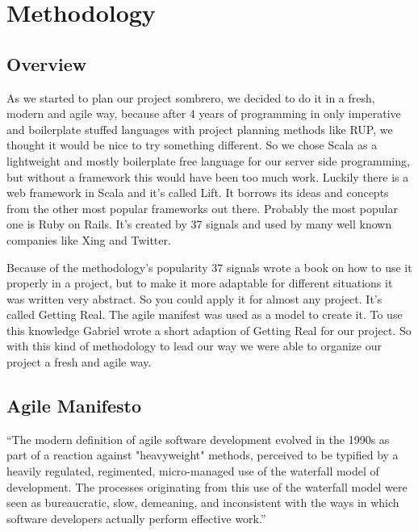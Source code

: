 \section{Methodology}
\subsection{Overview}

As we started to plan our project sombrero, we decided to do it in a fresh, modern and agile way, because after 4 years of programming in only imperative and boilerplate stuffed languages with project planning methods like RUP, we thought it would be nice to try something different. So we chose Scala as a lightweight and mostly boilerplate free language for our server side programming, but without a framework this would have been too much work. Luckily there is a web framework in Scala and it's called Lift. It borrows its ideas and concepts from the other most popular frameworks out there. Probably the most popular one is Ruby on Rails. It's created by 37 signals and used by many well known companies like Xing and Twitter.

Because of the methodology's popularity 37 signals wrote a book on how to use it properly in a project, but to make it more adaptable for different situations it was written very abstract. So you could apply it for almost any project. It's called Getting Real. The agile manifest was used as a model to create it. To use this knowledge Gabriel wrote a short adaption of Getting Real for our project. So with this kind of methodology to lead our way we were able to organize our project a fresh and agile way.

  \clearpage
\subsection{Agile Manifesto}
 ``The modern definition of agile software development evolved in the 1990s as part of a reaction against "heavyweight" methods, perceived to be typified by a heavily regulated, regimented, micro-managed use of the waterfall model of development. The processes originating from this use of the waterfall model were seen as bureaucratic, slow, demeaning, and inconsistent with the ways in which software developers actually perform effective work.''\cite{wikipedia.org:agile}

